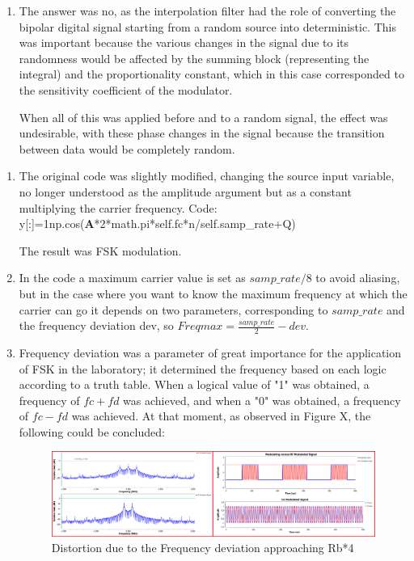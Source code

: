 \documentclass{journal}[IEEEtran, twocolumn]             %
\begin{document}
\begin{multicols}{2}
\begin{enumerate}
    \item The answer was no, as the interpolation filter had the role of converting the bipolar digital signal starting from a random source into deterministic. This was important because the various changes in the signal due to its randomness would be affected by the summing block (representing the integral) and the proportionality constant, which in this case corresponded to the sensitivity coefficient of the modulator.
    
    When all of this was applied before and to a random signal, the effect was undesirable, with these phase changes in the signal because the transition between data would be completely random.

    \end{enumerate}

    \begin{enumerate}[label=\Alph*]

    \item The original code was slightly modified, changing the source input variable, no longer understood as the amplitude argument but as a constant multiplying the carrier frequency.
     Code: y[:]=1\*np.cos(\textbf{A}*2*math.pi*self.fc*n/self.samp\_rate+Q)

     The result was FSK modulation.
     
    \item In the code a maximum carrier value is set as $samp\_rate/8$ to avoid aliasing, but in the case where you want to know the maximum frequency at which the carrier can go it depends on two parameters, corresponding to $samp\_rate$ and the frequency deviation dev, so  $Freqmax = \frac{samp\_rate}{2} - dev$.
    
    \item Frequency deviation was a parameter of great importance for the application of FSK in the laboratory; it determined the frequency based on each logic according to a truth table. When a logical value of "1" was obtained, a frequency of $fc+fd$ was achieved, and when a "0" was obtained, a frequency of $fc-fd$ was achieved. At that moment, as observed in Figure X, the following could be concluded:

    \begin{figure}[H]
        \centering
            \centering
            \includegraphics[width=0.7\columnwidth]{figs/Fd.png}
        \caption{Distortion due to the Frequency deviation approaching Rb*4}
        \label{fig:figB}
    \end{figure}


\end{enumerate}
\end{multicols}
\end{document}
